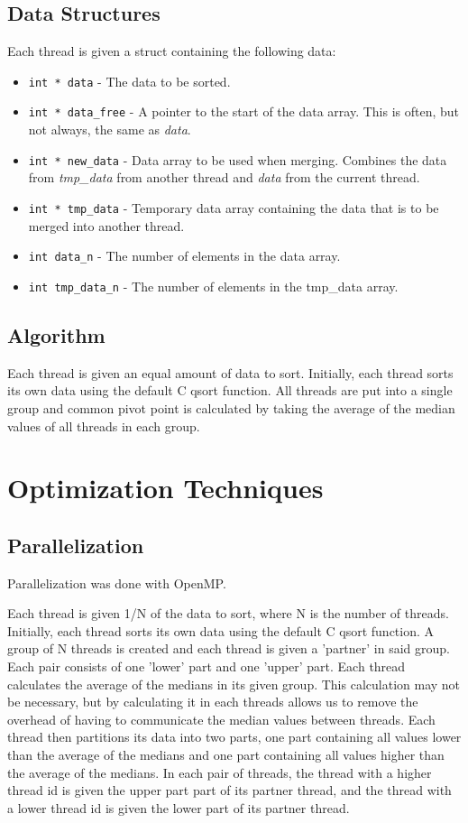 \documentclass{report}
\begin{document}
\subsection{Data Structures}
Each thread is given a struct containing the following data:
\begin{itemize}
    \item \texttt{int * data} - The data to be sorted.
    \item \texttt{int * data\_free} - A pointer to the start of the data array. This is often, but not always, the same as \textit{data}.
    \item \texttt{int * new\_data} - Data array to be used when merging. Combines the data from \textit{tmp\_data} from another thread and 
        \textit{data} from the current thread.
    \item \texttt{int * tmp\_data} - Temporary data array containing the data that is to be merged into another thread.
    \item \texttt{int data\_n} - The number of elements in the data array.
    \item \texttt{int tmp\_data\_n} - The number of elements in the tmp\_data array.
\end{itemize}

\subsection{Algorithm}
Each thread is given an equal amount of data to sort. Initially, each thread sorts its own data using the default C qsort function. 
All threads are put into a single group and common pivot point is calculated by taking the average of the median values of all threads in each group.
\section{Optimization Techniques}
\subsection{Parallelization}
Parallelization was done with OpenMP. 

Each thread is given 1/N of the data to sort, where N is the number of threads.
Initially, each thread sorts its own data using the default C qsort function. A group of N threads is created and each thread is given a 'partner' in said group. Each pair consists of one 'lower' part and one 'upper' part. 
Each thread calculates the average of the medians in its given group. This calculation may not be necessary, but by calculating it in each threads allows us to remove the overhead of having to communicate the median values between threads. 
Each thread then partitions its data into two parts, one part containing all values lower than the average of the medians and one part containing all values higher than the average of the medians. In each pair of threads,
the thread with a higher thread id is given the upper part part of its partner thread, and the thread with a lower thread id is given the lower part of its partner thread.
\end{document}
